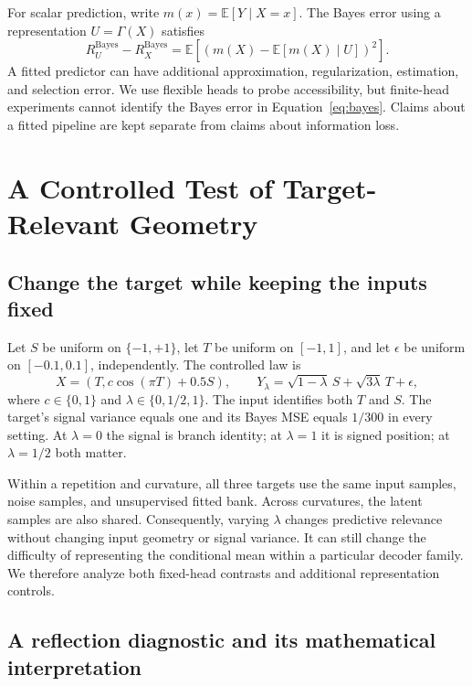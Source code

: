 \documentclass[10pt]{article}
\newcommand{\E}{\mathbb{E}}
\begin{document}
For scalar prediction, write $m(x)=\E[Y\mid X=x]$. The Bayes error using a
representation $U=\Gamma(X)$ satisfies
\begin{equation}\label{eq:bayes}
 R_U^{\mathrm{Bayes}}-R_X^{\mathrm{Bayes}}
 =\E\left[(m(X)-\E[m(X)\mid U])^2\right].
\end{equation}
A fitted predictor can have additional approximation, regularization,
estimation, and selection error. We use flexible heads to probe accessibility,
but finite-head experiments cannot identify the Bayes error in
Equation~\eqref{eq:bayes}. Claims about a fitted pipeline are kept separate
from claims about information loss.

\section{A Controlled Test of Target-Relevant Geometry}\label{sec:controlled}

\subsection{Change the target while keeping the inputs fixed}

Let $S$ be uniform on $\{-1,+1\}$, let $T$ be uniform on $[-1,1]$, and let
$\epsilon$ be uniform on $[-0.1,0.1]$, independently. The controlled law is
\begin{equation}\label{eq:branch}
 X=(T,c\cos(\pi T)+0.5S),\qquad
 Y_\lambda=\sqrt{1-\lambda}\,S+\sqrt{3\lambda}\,T+\epsilon,
\end{equation}
where $c\in\{0,1\}$ and $\lambda\in\{0,1/2,1\}$. The input identifies both
$T$ and $S$. The target's signal variance equals one and its Bayes MSE equals
$1/300$ in every setting. At $\lambda=0$ the signal is branch identity;
at $\lambda=1$ it is signed position; at $\lambda=1/2$ both matter.

Within a repetition and curvature, all three targets use the same input
samples, noise samples, and unsupervised fitted bank. Across curvatures, the
latent samples are also shared. Consequently, varying $\lambda$ changes
predictive relevance without changing input geometry or signal variance.
It can still change the difficulty of representing the conditional mean
within a particular decoder family. We therefore analyze both fixed-head
contrasts and additional representation controls.

\subsection{A reflection diagnostic and its mathematical interpretation}
\end{document}
